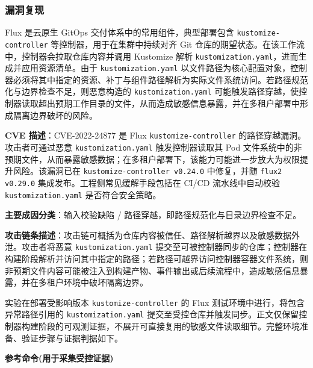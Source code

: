 
\subsubsection{漏洞复现}

Flux 是云原生 GitOps 交付体系中的常用组件，典型部署包含 \texttt{kustomize\allowbreak-controller} 等控制器，用于在集群中持续对齐 Git 仓库的期望状态。在该工作流中，控制器会拉取仓库内容并调用 Kustomize 解析 \texttt{kustomization\allowbreak.yaml}，进而生成并应用资源清单。由于 \texttt{kustomization\allowbreak.yaml} 以文件路径为核心配置对象，控制器必须将其中指定的资源、补丁与组件路径解析为实际文件系统访问。若路径规范化与边界检查不足，则恶意构造的 \texttt{kustomization\allowbreak.yaml} 可能触发路径穿越，使控制器读取超出预期工作目录的文件，从而造成敏感信息暴露，并在多租户部署中形成隔离边界破坏的风险。

\textbf{CVE 描述}：CVE-2022-24877 是 Flux \texttt{kustomize\allowbreak-controller} 的路径穿越漏洞。攻击者可通过恶意 \texttt{kustomization\allowbreak.yaml} 触发控制器读取其 Pod 文件系统中的非预期文件，从而暴露敏感数据；在多租户部署下，该能力可能进一步放大为权限提升风险。该漏洞已在 \texttt{kustomize\allowbreak-controller v0.24.0} 中修复，并随 \texttt{flux2 v0.29.0} 集成发布。工程侧常见缓解手段包括在 CI/CD 流水线中自动校验 \texttt{kustomization\allowbreak.yaml} 是否符合安全策略。

\textbf{主要成因分类}：输入校验缺陷 / 路径穿越，即路径规范化与目录边界检查不足。

\textbf{攻击链条描述}：攻击链可概括为仓库内容被信任、路径解析越界以及敏感数据外泄。攻击者将恶意 \texttt{kustomization\allowbreak.yaml} 提交至可被控制器同步的仓库；控制器在构建阶段解析并访问其中指定的路径；若路径可越界访问控制器容器文件系统，则非预期文件内容可能被注入到构建产物、事件输出或后续流程中，造成敏感信息暴露，并在多租户环境中破坏隔离边界。


实验在部署受影响版本 \texttt{kustomize-controller} 的 Flux 测试环境中进行，将包含异常路径引用的 \texttt{kustomization\allowbreak.yaml} 提交至受控仓库并触发同步。正文仅保留控制器构建阶段的可观测证据，不展开可直接复用的敏感文件读取细节。完整环境准备、验证步骤与证据判据如下。


\textbf{参考命令(用于采集受控证据)}


